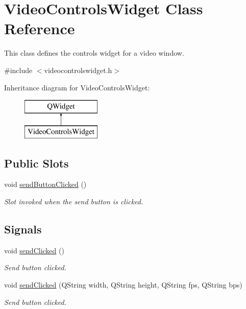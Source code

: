\hypertarget{classVideoControlsWidget}{\section{Video\-Controls\-Widget Class Reference}
\label{classVideoControlsWidget}
}


This class defines the controls widget for a video window.  




{\ttfamily \#include $<$videocontrolswidget.\-h$>$}

Inheritance diagram for Video\-Controls\-Widget\-:\begin{figure}[H]
\begin{center}
\leavevmode
\includegraphics[height=2.000000cm]{classVideoControlsWidget}
\end{center}
\end{figure}
\subsection*{Public Slots}
\begin{DoxyCompactItemize}
\item 
void \hyperlink{classVideoControlsWidget_aff63e3d97d541cf8c05d53dd32e26292}{send\-Button\-Clicked} ()
\begin{DoxyCompactList}\small\item\em Slot invoked when the send button is clicked. \end{DoxyCompactList}\end{DoxyCompactItemize}
\subsection*{Signals}
\begin{DoxyCompactItemize}
\item 
void \hyperlink{classVideoControlsWidget_a5d85d6628fdb2016d49228bffb569679}{send\-Clicked} ()
\begin{DoxyCompactList}\small\item\em Send button clicked. \end{DoxyCompactList}\item 
void \hyperlink{classVideoControlsWidget_a9c0561d628dd239a37d1a0d52ce3a475}{send\-Clicked} (Q\-String width, Q\-String height, Q\-String fps, Q\-String bps)
\begin{DoxyCompactList}\small\item\em Send button clicked. \end{DoxyCompactList}\end{DoxyCompactItemize}
